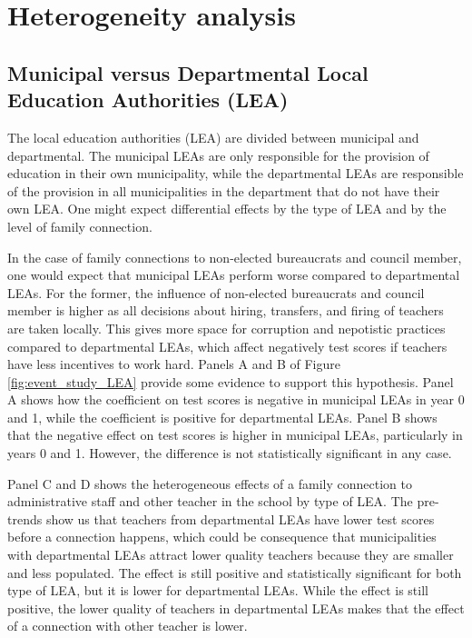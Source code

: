 \documentclass[12pt,runningheads]{article}
\begin{document}
\section{Heterogeneity analysis}

\subsection{Municipal versus Departmental Local Education Authorities (LEA)}

The local education authorities (LEA) are divided between municipal and departmental. The municipal LEAs are only responsible for the provision of education in their own municipality, while the departmental LEAs are responsible of the provision in all municipalities in the department that do not have their own LEA. One might expect differential effects by the type of LEA and by the level of family connection.

In the case of family connections to non-elected bureaucrats and council member, one would expect that municipal LEAs perform worse compared to departmental LEAs. For the former, the influence of non-elected bureaucrats and council member is higher as all decisions about hiring, transfers, and firing of teachers are taken locally. This gives more space for corruption and nepotistic practices compared to departmental LEAs, which affect negatively test scores if teachers have less incentives to work hard. Panels A and B of Figure \ref{fig:event_study_LEA} provide some evidence to support this hypothesis. Panel A shows how the coefficient on test scores is negative in municipal LEAs in year 0 and 1, while the coefficient is positive for departmental LEAs. Panel B shows that the negative effect on test scores is higher in municipal LEAs, particularly in years 0 and 1. However, the difference is not statistically significant in any case.

Panel C and D shows the heterogeneous effects of a family connection to administrative staff and other teacher in the school by type of LEA. The pre-trends show us that teachers from departmental LEAs have lower test scores before a connection happens, which could be consequence that municipalities with departmental LEAs attract lower quality teachers because they are smaller and less populated. The effect is still positive and statistically significant for both type of LEA, but it is lower for departmental LEAs. While the effect is still positive, the lower quality of teachers in departmental LEAs makes that the effect of a connection with other teacher is lower.
 
\end{document}
